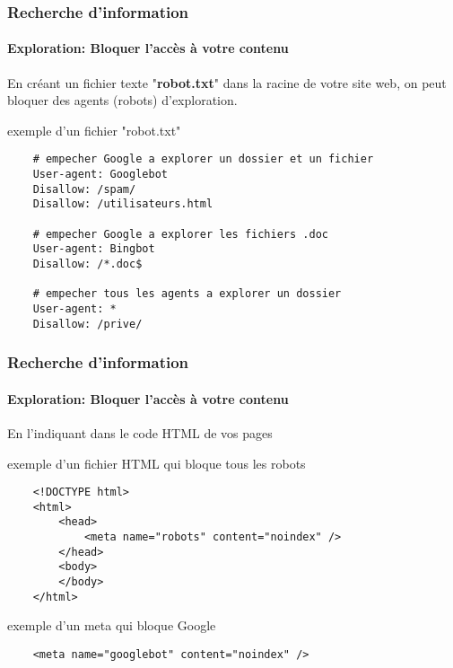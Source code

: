 \documentclass[xcolor=table]{beamer}
\begin{document}
\begin{frame}[fragile]
\frametitle{Recherche d'information}
\framesubtitle{Exploration: Bloquer l'accès à votre contenu}


En créant un fichier texte "\textbf{robot.txt}" dans la racine de votre site web, on peut bloquer des agents (robots) d'exploration.

%	

\begin{exampleblock}{exemple d'un fichier "robot.txt"}
	\scriptsize\bfseries
	\begin{lstlisting}
	# empecher Google a explorer un dossier et un fichier
	User-agent: Googlebot
	Disallow: /spam/ 
	Disallow: /utilisateurs.html
	
	# empecher Google a explorer les fichiers .doc 
	User-agent: Bingbot
	Disallow: /*.doc$ 
	
	# empecher tous les agents a explorer un dossier
	User-agent: *
	Disallow: /prive/
	\end{lstlisting}
\end{exampleblock}


\end{frame}

\begin{frame}[fragile]
\frametitle{Recherche d'information}
\framesubtitle{Exploration: Bloquer l'accès à votre contenu}

En l'indiquant dans le code HTML de vos pages

\begin{exampleblock}{exemple d'un fichier HTML qui bloque tous les robots}
	\scriptsize\bfseries
	\begin{lstlisting}
	<!DOCTYPE html>
	<html>
	    <head>
	        <meta name="robots" content="noindex" />
	    </head>
	    <body>
	    </body>
	</html>
	\end{lstlisting}
\end{exampleblock}

\begin{exampleblock}{exemple d'un meta qui bloque Google}
	\scriptsize\bfseries
	\begin{lstlisting}
	<meta name="googlebot" content="noindex" />
	\end{lstlisting}
\end{exampleblock}

\end{frame}
\end{document}
